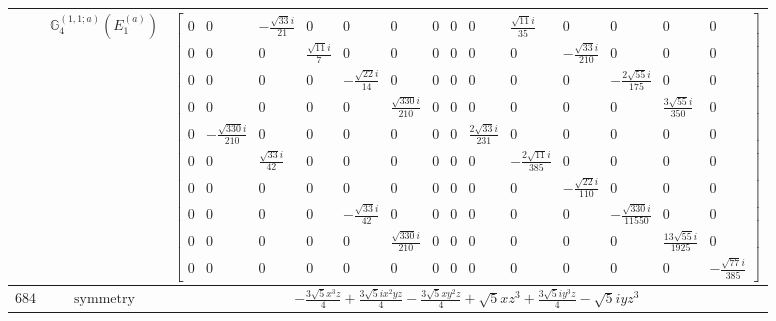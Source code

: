 \documentclass[fleqn,8pt,landscape]{jsarticle}
\begin{document}
\begin{longtable}{ccc}
$  $ & $ \mathbb{G}_{4}^{(1,1;a)}(E_{1}^{(a)}) $ & $ \begin{bmatrix} 0 & 0 & - \frac{\sqrt{33} i}{21} & 0 & 0 & 0 & 0 & 0 & 0 & \frac{\sqrt{11} i}{35} & 0 & 0 & 0 & 0 \\ 0 & 0 & 0 & \frac{\sqrt{11} i}{7} & 0 & 0 & 0 & 0 & 0 & 0 & - \frac{\sqrt{33} i}{210} & 0 & 0 & 0 \\ 0 & 0 & 0 & 0 & - \frac{\sqrt{22} i}{14} & 0 & 0 & 0 & 0 & 0 & 0 & - \frac{2 \sqrt{55} i}{175} & 0 & 0 \\ 0 & 0 & 0 & 0 & 0 & \frac{\sqrt{330} i}{210} & 0 & 0 & 0 & 0 & 0 & 0 & \frac{3 \sqrt{55} i}{350} & 0 \\ 0 & - \frac{\sqrt{330} i}{210} & 0 & 0 & 0 & 0 & 0 & 0 & \frac{2 \sqrt{33} i}{231} & 0 & 0 & 0 & 0 & 0 \\ 0 & 0 & \frac{\sqrt{33} i}{42} & 0 & 0 & 0 & 0 & 0 & 0 & - \frac{2 \sqrt{11} i}{385} & 0 & 0 & 0 & 0 \\ 0 & 0 & 0 & 0 & 0 & 0 & 0 & 0 & 0 & 0 & - \frac{\sqrt{22} i}{110} & 0 & 0 & 0 \\ 0 & 0 & 0 & 0 & - \frac{\sqrt{33} i}{42} & 0 & 0 & 0 & 0 & 0 & 0 & - \frac{\sqrt{330} i}{11550} & 0 & 0 \\ 0 & 0 & 0 & 0 & 0 & \frac{\sqrt{330} i}{210} & 0 & 0 & 0 & 0 & 0 & 0 & \frac{13 \sqrt{55} i}{1925} & 0 \\ 0 & 0 & 0 & 0 & 0 & 0 & 0 & 0 & 0 & 0 & 0 & 0 & 0 & - \frac{\sqrt{77} i}{385} \end{bmatrix} $ \\ \hline
$ 684 $ & $ \text{symmetry} $ & $ - \frac{3 \sqrt{5} x^{3} z}{4} + \frac{3 \sqrt{5} i x^{2} y z}{4} - \frac{3 \sqrt{5} x y^{2} z}{4} + \sqrt{5} x z^{3} + \frac{3 \sqrt{5} i y^{3} z}{4} - \sqrt{5} i y z^{3} $ \\

\end{longtable}
\end{document}
